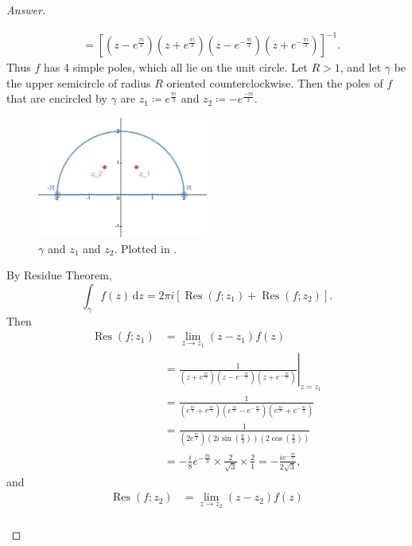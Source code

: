 \documentclass[12pt]{article}
\newcommand\inv[1]{#1^{-1}}
\newcommand\paren[1]{\left( #1 \right)}
\newcommand{\sqbrack}[1]{\left [ #1 \right ]}
\theoremstyle{definition}
\DeclareMathOperator\Res{Res}
\begin{document}
\begin{proof}[Answer]
\begin{enumerate}[(i)]
\begin{align*}
            & = \inv{ \sqbrack{ \paren{ z - e^{\frac{\pi i}{3}} } \paren{ z + e^{\frac{\pi i}{3}} } \paren{ z - e^{-\frac{\pi i}{3}} } \paren{ z + e^{-\frac{\pi i}{3}} } } }.
        \end{align*}
        Thus $f$ has 4 simple poles, which all lie on the unit circle. Let $R > 1$, and let $\gamma$ be the upper semicircle of radius $R$ oriented counterclockwise. Then the poles of $f$ that are encircled by $\gamma$ are $z_1 \coloneqq e^{\frac{\pi i}{3}}$ and $z_2 \coloneqq -e^{\frac{-\pi i}{3}}$.
        \begin{figure}[H]
            \centering
            \includegraphics[width = 0.5\textwidth]{6.png}
            \caption{$\gamma$ and $z_1$ and $z_2$. Plotted in \cite{Desmos}.}
            \label{fig:fig6}
        \end{figure}
        By Residue Theorem,
        \[
            \int_{\gamma} f(z) \, \mathrm{d}z = 2\pi i \sqbrack{ \Res \paren{ f ; z_1 } + \Res \paren{ f ; z_2 } }.
        \]
        Then 
        \begin{align*}
            \Res(f;z_1) & = \lim\limits_{z \to z_1} (z - z_1) f(z) \\
            & = \left. \frac{1}{ \paren{ z + e^{\frac{\pi i}{3}} } \paren{ z - e^{-\frac{\pi i}{3}} } \paren{ z + e^{-\frac{\pi i}{3}} } } \right|_{z = z_1} \\
            & = \frac{1}{ \paren{ e^{\frac{\pi i}{3}} + e^{\frac{\pi i}{3}} } \paren{ e^{\frac{\pi i}{3}} - e^{-\frac{\pi i}{3}} } \paren{ e^{\frac{\pi i}{3}} + e^{-\frac{\pi i}{3}} } } \\
            & = \frac{1}{ \paren{ 2e^{\frac{\pi i}{3}} } \paren{ 2i \sin \paren{ \frac{\pi}{3} } } \paren{ 2 \cos \paren{ \frac{\pi}{3} } } } \\
            & = -\frac{i}{8} e^{-\frac{\pi i}{3}} \times \frac{2}{\sqrt{3}} \times \frac{2}{1} = -\frac{i e^{-\frac{\pi i}{3}} }{2\sqrt{3}},
        \end{align*}
        and 
        \begin{align*}
            \Res(f;z_2) & = \lim\limits_{z \to z_2} (z - z_2) f(z) \\

\end{align*}
\end{enumerate}
\end{proof}
\end{document}
